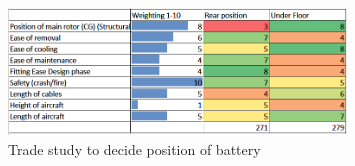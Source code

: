 \documentclass[11pt,a4paper]{article}
\begin{document}
\begin{appendices}
\begin{figure}[H]
	\centering
	\includegraphics[width=0.8\textwidth]{batterypos.PNG}
	\caption{Trade study to decide position of battery}
	\centering
	\label{fig:batterypos}
\end{figure}
\end{appendices}{}
\end{document}
